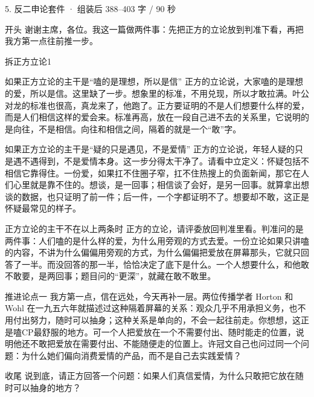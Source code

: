 \documentclass[script,con]{debate}
\begin{document}
\begin{kit}{5. 反二申论}{套件 · 组装后 388–403 字 / 90 秒}
\begin{fixed}{开头}
谢谢主席，各位。我这一篇做两件事：先把正方的立论放到判准下看，再把我方第一点往前推一步。
\end{fixed}
\begin{pick}{拆正方立论}{1}
\begin{module}{如果正方立论的主干是“嗑的是理想，所以是信”}
正方的立论说，大家嗑的是理想的爱，所以是信。这里缺了一步。想象里的标准，不用兑现，所以才敢拉满。叶公对龙的标准也很高，真龙来了，他跑了。正方要证明的不是人们想要什么样的爱，而是人们相信这样的爱会来。标准再高，放在一段自己进不去的关系里，它说明的是向往，不是相信。向往和相信之间，隔着的就是一个“敢”字。
\end{module}
\begin{module}{如果正方立论的主干是“疑的只是遇见，不是爱情”}
正方的立论说，年轻人疑的只是遇不遇得到，不是爱情本身。这一步分得太干净了。请看中立定义：怀疑包括不相信它靠得住。一份爱，如果扛不住圈子窄，扛不住热搜上的负面新闻，那它在人们心里就是靠不住的。想谈，是一回事；相信谈了会好，是另一回事。就算拿出想谈的数据，也只证明了前一件；后一件，一个字都证明不了。想要却不敢，这正是怀疑最常见的样子。
\end{module}
\begin{fallback}{正方立论的主干不在以上两条时}
正方的立论，请评委放回判准里看。判准问的是两件事：人们嗑的是什么样的爱，为什么用旁观的方式去爱。一份立论如果只讲嗑的内容，不讲为什么偏偏用旁观的方式，为什么偏偏把爱放在屏幕那头，它就只回答了一半。而没回答的那一半，恰恰决定了底下是什么。一个人想要什么，和他敢不敢要，是两回事；题目问的“更深”，就藏在敢不敢里。
\end{fallback}
\end{pick}
\begin{fixed}{推进论点一}
我方第一点，信在远处，今天再补一层。两位传播学者 Horton 和 Wohl 在一九五六年就描述过这种隔着屏幕的关系：观众几乎不用承担义务，也不用付出努力，随时可以抽身；这种关系是单向的，不会一起往前走。你想想，这正是嗑CP最舒服的地方。可一个人把爱放在一个不需要付出、随时能走的位置，说明他还不敢把爱放在需要付出、不能随便走的位置上。许冠文自己也问过同一个问题：为什么她们偏向消费爱情的产品，而不是自己去实践爱情？
\end{fixed}
\begin{fixed}{收尾}
说到底，请正方回答一个问题：如果人们真信爱情，为什么只敢把它放在随时可以抽身的地方？
\end{fixed}
\end{kit}
\end{document}
